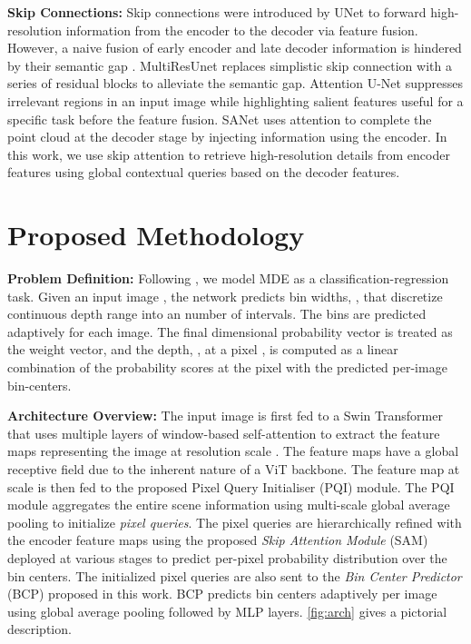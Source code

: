 \documentclass[10pt,twocolumn,letterpaper]{article}
\newcommand{\myfirstpara}[1]{\par \noindent \textbf{#1:}}
\newcommand{\mypara}[1]{\vspace{0.5em} \myfirstpara{#1}}
\begin{document}
\mypara{Skip Connections}
Skip connections were introduced by UNet \cite{unet} to forward high-resolution information from the encoder to the decoder via feature fusion. However, a naive fusion of early encoder and late decoder information is hindered by their semantic gap \cite{hybrid}. MultiResUnet \cite{MultiResUNet} replaces simplistic skip connection with a series of residual blocks to alleviate the semantic gap. Attention U-Net \cite{attentionunet} suppresses irrelevant regions in an input image while highlighting salient features useful for a specific task before the feature fusion. SANet \cite{Wen_2020_CVPR} uses attention to complete the point cloud at the decoder stage by injecting information using the encoder. In this work, we use skip attention to retrieve high-resolution details from encoder features using global contextual queries based on the decoder features. 






 
\section{Proposed Methodology}


\myfirstpara{Problem Definition}
Following \cite{adabins, dorn}, we model MDE as a classification-regression task. Given an input image , the network predicts bin widths, , that discretize continuous depth range into an  number of intervals. The bins are predicted adaptively for each image. The final  dimensional probability vector is treated as the weight vector, and the depth, , at a pixel , is computed as a linear combination of the probability scores at the pixel with the predicted per-image bin-centers.



\mypara{Architecture Overview}
The input image  is first fed to a Swin Transformer \cite{swin} that uses multiple layers of window-based self-attention to extract the feature maps representing the image at resolution scale  \wrt . The feature maps have a global receptive field due to the inherent nature of a ViT backbone. The feature map at  scale is then fed to the proposed Pixel Query Initialiser (PQI) module. The PQI module aggregates the entire scene information using multi-scale global average pooling to initialize \emph{pixel queries}. The pixel queries are hierarchically refined with the encoder feature maps using the proposed \emph{Skip Attention Module} (SAM) deployed at various stages to predict per-pixel probability distribution over the bin centers. The initialized pixel queries are also sent to the \emph{Bin Center Predictor} (BCP) proposed in this work. BCP predicts bin centers adaptively per image using global average pooling followed by MLP layers. \cref{fig:arch} gives a pictorial description.
\end{document}
